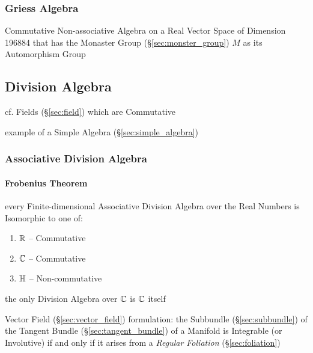 {{\subsubsection{Griess Algebra}\label{sec:griess_algebra}

Commutative Non-associative Algebra on a Real Vector Space of Dimension 196884
that has the Monaster Group (\S\ref{sec:monster_group}) $M$ as its Automorphism
Group



\subsection{Division Algebra}\label{sec:division_algebra}

cf. Fields (\S\ref{sec:field}) which are Commutative

example of a Simple Algebra (\S\ref{sec:simple_algebra})



\subsubsection{Associative Division Algebra}
\label{sec:associative_division_algebra}

\paragraph{Frobenius Theorem}\label{sec:frobenius_theorem}\hfill

every Finite-dimensional Associative Division Algebra over the Real Numbers is
Isomorphic to one of:
\begin{enumerate}
  \item $\mathbb{R}$ -- Commutative
  \item $\mathbb{C}$ -- Commutative
  \item $\mathbb{H}$ -- Non-commutative
\end{enumerate}

the only Division Algebra over $\mathbb{C}$ is $\mathbb{C}$ itself

Vector Field (\S\ref{sec:vector_field}) formulation: the Subbundle
(\S\ref{sec:subbundle}) of the Tangent Bundle (\S\ref{sec:tangent_bundle}) of a
Manifold is Integrable (or Involutive) if and only if it arises from a
\emph{Regular Foliation} (\S\ref{sec:foliation})

}}
